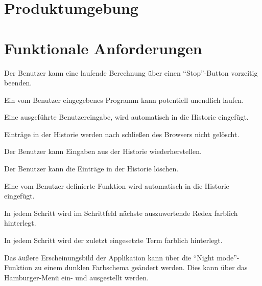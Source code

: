 \documentclass[parskip=full,11pt,twoside]{scrartcl}
\begin{document}
\section{Produktumgebung}



\section{Funktionale Anforderungen}

 
Der Benutzer kann eine laufende Berechnung über einen \enquote{Stop}-Button vorzeitig beenden.

Ein vom Benutzer eingegebenes Programm kann potentiell unendlich laufen.

Eine ausgeführte Benutzereingabe, wird automatisch in die Historie eingefügt.

Einträge in der Historie werden nach schließen des Browsers nicht gelöscht.

Der Benutzer kann Eingaben aus der Historie wiederherstellen.

Der Benutzer kann die Einträge in der Historie löschen.

Eine vom Benutzer definierte Funktion wird automatisch in die Historie eingefügt.

In jedem Schritt wird im Schrittfeld nächste auszuwertende Redex farblich hinterlegt.

In jedem Schritt wird der zuletzt eingesetzte Term farblich hinterlegt.

Das äußere Erscheinungsbild der Applikation kann über die \enquote{Night mode}-Funktion zu einem dunklen Farbschema geändert werden. Dies kann über das Hamburger-Menü ein- und ausgestellt werden.
\end{document}
